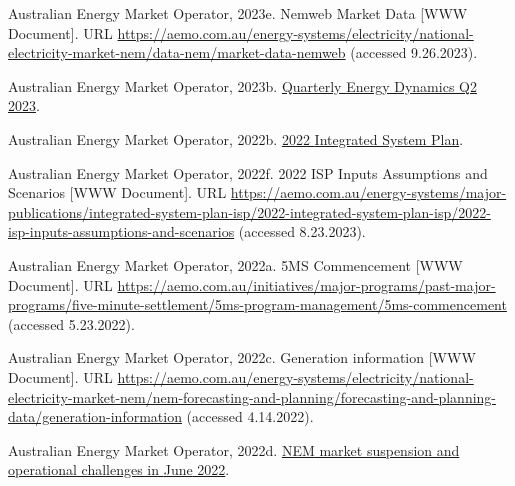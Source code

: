 \documentclass[12pt,a4paper,]{report}
\newlength{\cslhangindent}
\newenvironment{CSLReferences}[2] %
 {%
  \setlength{\parindent}{0pt}
  \ifodd #1 \everypar{\setlength{\hangindent}{\cslhangindent}}\ignorespaces\fi
  \ifnum #2 > 0
  \setlength{\parskip}{#2\baselineskip}
  \fi
 }%
 {}
\begin{document}
\begin{CSLReferences}{1}{0}
\leavevmode{}%
Australian Energy Market Operator, 2023e. Nemweb {Market Data} {[}WWW
Document{]}. URL
\url{https://aemo.com.au/energy-systems/electricity/national-electricity-market-nem/data-nem/market-data-nemweb}
(accessed 9.26.2023).

\leavevmode{}%
Australian Energy Market Operator, 2023b.
\href{https://aemo.com.au/-/media/files/major-publications/qed/2023/qed-q2-2023-report.pdf?la=en&hash=719538BE6166CB79BE1BF6B9BE82A183}{Quarterly
{Energy Dynamics Q2} 2023}.

\leavevmode{}%
Australian Energy Market Operator, 2022b.
\href{https://aemo.com.au/-/media/files/major-publications/isp/2022/2022-documents/2022-integrated-system-plan-isp.pdf?la=en}{2022
{Integrated System Plan}}.

\leavevmode{}%
Australian Energy Market Operator, 2022f. 2022 {ISP Inputs Assumptions}
and {Scenarios} {[}WWW Document{]}. URL
\url{https://aemo.com.au/energy-systems/major-publications/integrated-system-plan-isp/2022-integrated-system-plan-isp/2022-isp-inputs-assumptions-and-scenarios}
(accessed 8.23.2023).

\leavevmode{}%
Australian Energy Market Operator, 2022a. {5MS Commencement} {[}WWW
Document{]}. URL
\url{https://aemo.com.au/initiatives/major-programs/past-major-programs/five-minute-settlement/5ms-program-management/5ms-commencement}
(accessed 5.23.2022).

\leavevmode{}%
Australian Energy Market Operator, 2022c. Generation information {[}WWW
Document{]}. URL
\url{https://aemo.com.au/energy-systems/electricity/national-electricity-market-nem/nem-forecasting-and-planning/forecasting-and-planning-data/generation-information}
(accessed 4.14.2022).

\leavevmode{}%
Australian Energy Market Operator, 2022d.
\href{https://aemo.com.au/-/media/files/electricity/nem/market_notices_and_events/market_event_reports/2022/nem-market-suspension-and-operational-challenges-in-june-2022.pdf?la=en}{{NEM}
market suspension and operational challenges in {June} 2022}.


\end{CSLReferences}
\end{document}
